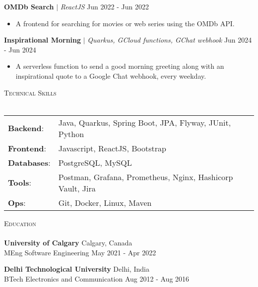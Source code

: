 \documentclass[a4paper]{article}
\newcommand{\lineunder} {
    \vspace*{-8pt} \\
    \hspace*{-18pt} \hrulefill \\
}
\newcommand{\header} [1] {
    \vspace*{5pt}
    {\hspace*{-18pt}\vspace*{6pt} \large\textsc{#1}}
    \vspace*{-6pt} \lineunder
}
\newcommand{\resumeHeadingProject}[3]{
    \vspace{1mm}
    {\textbf{#1}} $|$ \emph{#2} \hfill {#3}
    \vspace{-1.5mm}
}
\newcommand{\resumeItemProject}[1]{
  \item{
    \begin{justify}
    \setlength{\rightskip}{0.15in} {#1 \vspace{-4pt}}
    \end{justify}
  }
}
\newcommand{\resumeHeadingEducation}[4]{
    \textbf{#1} \hfill {#2}\\
    {#3} \hfill {#4}\\
    \vspace{2mm}
}
\begin{document}
\resumeHeadingProject {OMDb Search} {ReactJS} {Jun 2022 - Jun 2022}
\begin{itemize}
    \resumeItemProject {A frontend for searching for movies or web series using the OMDb API.}
\end{itemize}

\resumeHeadingProject {Inspirational Morning} {Quarkus, GCloud functions, GChat webhook} {Jun 2024 - Jun 2024}
\begin{itemize}
    \resumeItemProject {A serverless function to send a good morning greeting along with an inspirational quote to a Google Chat webhook, every weekday.}
\end{itemize}


\header{Technical Skills}

\begin{tabular}{ l l }
    \textbf{Backend}:   & Java, Quarkus, Spring Boot, JPA, Flyway, JUnit, Python                        \\
    \textbf{Frontend}:  & Javascript, ReactJS, Bootstrap                                                \\
    \textbf{Databases}: & PostgreSQL, MySQL                                                             \\
    \textbf{Tools}:     & Postman, Grafana, Prometheus, Nginx, Hashicorp Vault, Jira                    \\
    \textbf{Ops}:       & Git, Docker, Linux, Maven                                                     \\
\end{tabular}
\vspace{2mm}


\header{Education}

\resumeHeadingEducation {University of Calgary} {Calgary, Canada} {MEng Software Engineering} {May 2021 - Apr 2022}
\resumeHeadingEducation {Delhi Technological University} {Delhi, India} {BTech Electronics and Communication} {Aug 2012 - Aug 2016}


\
\end{document}
